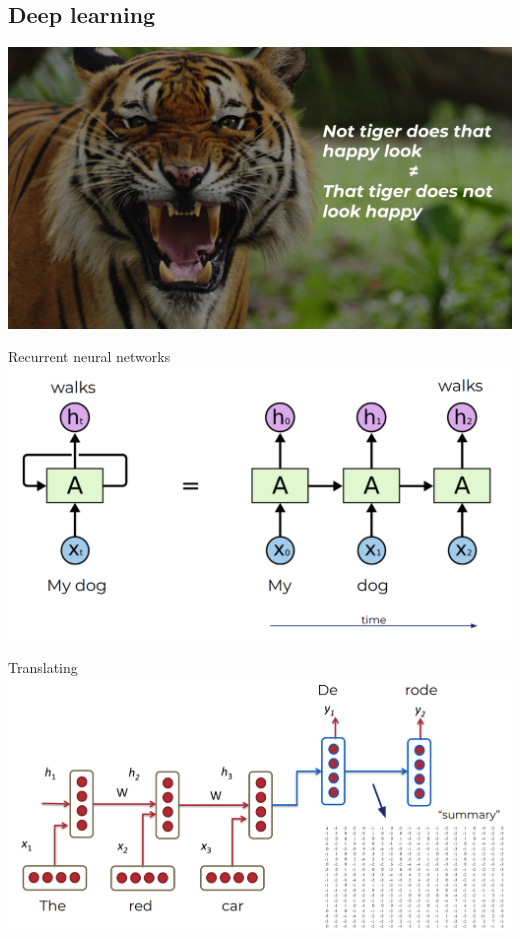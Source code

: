 \documentclass[pdf]{beamer}
\begin{document}
    \subsection{Deep learning}
    { %
    \begin{frame}[plain]
        \hspace*{-6cm}
        \includegraphics[scale=0.35]{figures/tiger.png}
    \end{frame}
    }

    \begin{frame}{Recurrent neural networks}
        \includegraphics[width=\textwidth]{figures/rnn.png}
    \end{frame}

    \begin{frame}{Translating}
        \includegraphics[width=\textwidth]{figures/encoder-decoder.png}
    \end{frame}
\end{document}
